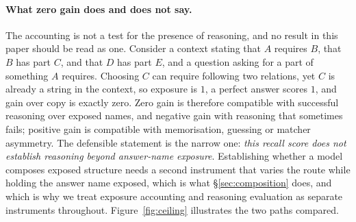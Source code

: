 \documentclass[10pt,twocolumn]{article}
\begin{document}
\paragraph{What zero gain does and does not say.} The accounting is not a test for the presence of reasoning, and no result in this paper should be read as one. Consider a context stating that $A$ requires $B$, that $B$ has part $C$, and that $D$ has part $E$, and a question asking for a part of something $A$ requires. Choosing $C$ can require following two relations, yet $C$ is already a string in the context, so exposure is $1$, a perfect answer scores $1$, and gain over copy is exactly zero. Zero gain is therefore compatible with successful reasoning over exposed names, and negative gain with reasoning that sometimes fails; positive gain is compatible with memorisation, guessing or matcher asymmetry. The defensible statement is the narrow one: \emph{this recall score does not establish reasoning beyond answer-name exposure}. Establishing whether a model composes exposed structure needs a second instrument that varies the route while holding the answer name exposed, which is what \S\ref{sec:composition} does, and which is why we treat exposure accounting and reasoning evaluation as separate instruments throughout. Figure~\ref{fig:ceiling} illustrates the two paths compared.


\end{document}
